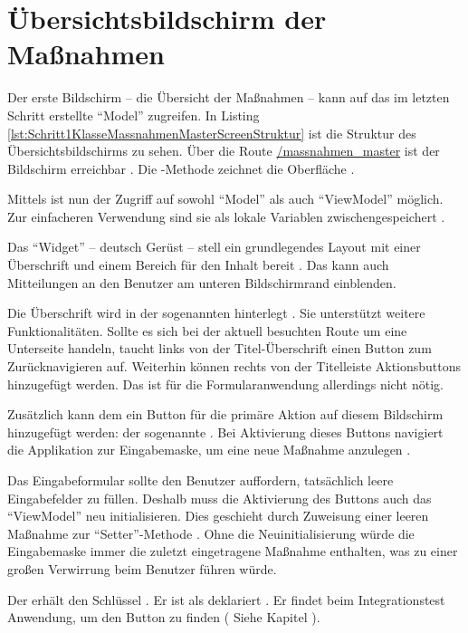 \clearpage
\section{Übersichtsbildschirm der Maßnahmen}

Der erste Bildschirm -- die Übersicht der Maßnahmen -- kann auf das im letzten Schritt erstellte \enquote{Model} zugreifen.
In Listing \ref{lst:Schritt1KlasseMassnahmenMasterScreenStruktur}  ist die Struktur des Übersichtsbildschirms zu sehen.
Über die Route \url{/massnahmen_master} ist der Bildschirm erreichbar . Die -Methode zeichnet die Oberfläche .

Mittels  ist nun der Zugriff auf sowohl \enquote{Model} als auch \enquote{ViewModel} möglich. Zur einfacheren Verwendung sind sie als lokale Variablen zwischengespeichert .

Das \enquote{Widget}  -- deutsch Gerüst --  stell  ein grundlegendes Layout mit einer Überschrift und einem Bereich für den Inhalt bereit .
Das  kann auch Mitteilungen an den Benutzer am unteren Bildschirmrand einblenden.

Die Überschrift wird in der sogenannten  hinterlegt .
Sie unterstützt weitere Funktionalitäten.
Sollte es sich bei der aktuell besuchten Route  um eine Unterseite handeln, taucht links von der Titel-Überschrift einen Button zum Zurücknavigieren auf.
Weiterhin können rechts von der Titelleiste Aktionsbuttons hinzugefügt werden. Das ist für die Formularanwendung allerdings nicht nötig.

Zusätzlich kann dem  ein Button für die primäre Aktion auf diesem Bildschirm hinzugefügt werden: der sogenannte  .
Bei Aktivierung dieses Buttons navigiert die Applikation zur Eingabemaske, um eine neue Maßnahme anzulegen .

Das Eingabeformular sollte den Benutzer auffordern, tatsächlich leere Eingabefelder zu füllen.
Deshalb muss die Aktivierung des Buttons auch das \enquote{ViewModel} neu initialisieren.
Dies geschieht durch Zuweisung einer leeren Maßnahme zur \enquote{Setter}-Methode  .
Ohne die Neuinitialisierung würde die Eingabemaske immer die zuletzt eingetragene Maßnahme enthalten, was zu einer großen Verwirrung beim Benutzer führen würde.

Der  erhält den Schlüssel  .
Er ist als  deklariert .
Er findet beim Integrationstest Anwendung, um den Button zu finden ( Siehe Kapitel ).

